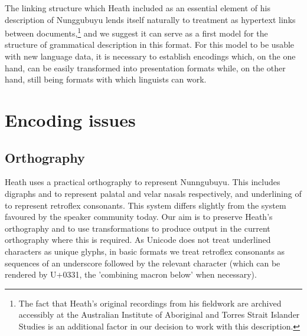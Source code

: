 The linking structure which Heath included as an essential element of his description of Nunggubuyu lends itself naturally to treatment as hypertext links between documents,\footnote{The 
 fact that Heath's original recordings from his fieldwork are archived accessibly at the Australian Institute of Aboriginal and Torres Strait Islander Studies is an additional factor in our decision to work with this description.
} 
and we suggest it can serve as a first model for the structure of grammatical description in this format. For this model to be usable with new language data, it is necessary to establish encodings which, on the one hand, can be easily transformed into presentation formats while, on the other hand, still being formats with which linguists can work.

\section{Encoding issues}\label{thie:sec:3}
\subsection{Orthography }\label{thie:sec:3-1}
Heath uses a practical orthography to represent Nunngubuyu. This includes digraphs  and  to represent palatal and velar nasals respectively, and underlining of  to represent retroflex consonants. This system differs slightly from the system favoured by the speaker community today.
Our aim is to preserve Heath's orthography and to use transformations
to produce output in the current orthography where this is required.
As Unicode does not treat underlined characters as unique glyphs, in
basic formats we treat retroflex consonants as sequences of an
underscore followed by the relevant character (which can be rendered
by U+0331, the 'combining macron below' when necessary).


